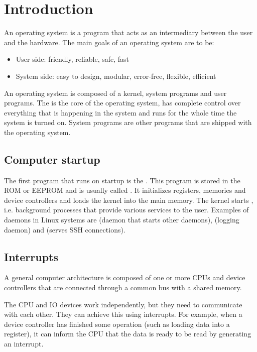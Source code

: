 \chapter{Introduction}

An operating system is a program that acts as an intermediary between the user and the hardware. The main goals of an operating system are to be:
\begin{itemize}
    \item User side: friendly, reliable, safe, fast
    \item System side: easy to design, modular, error-free, flexible, efficient
\end{itemize}

An operating system is composed of a kernel, system programs and user programs. The  is the core of the operating system, has complete control over everything that is happening in the system and runs for the whole time the system is turned on. System programs are other programs that are shipped with the operating system.

\section{Computer startup}

The first program that runs on startup is the . This program is stored in the ROM or EEPROM and is usually called
. It initializes registers, memories and device controllers and loads the kernel into the main memory. The kernel starts , i.e. background processes that provide various services to the user. Examples of daemons in Linux systems are  (daemon that starts other daemons),  (logging daemon) and  (serves SSH connections).

\section{Interrupts}

A general computer architecture is composed of one or more CPUs and device controllers that are connected through a common bus with a shared memory.


The CPU and IO devices work independently, but they need to communicate with
each other. They can achieve this using interrupts. For example, when a device
controller has finished some operation (such as loading data into a register),
it can inform the CPU that the data is ready to be read by generating an
interrupt.

